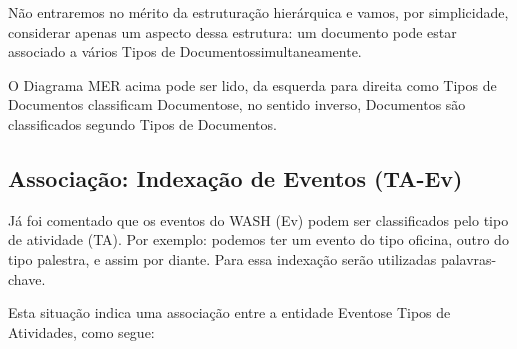 \documentclass[
12pt,		%
openright,	%
twoside,  %
a4paper,			%
chapter=TITLE,		%
english,			%
french,				%
spanish,			%
brazil				%
]{USPSC-classe/USPSC}
\begin{document}
N\~ao entraremos no m\'erito da estrutura\c{c}\~ao hier\'arquica e vamos, por simplicidade, considerar apenas um aspecto dessa estrutura: um documento pode estar associado a v\'arios \textquotedbl Tipos de Documentos\textquotedbl  simultaneamente.






O Diagrama MER acima pode ser lido, da esquerda para direita como \textquotedbl Tipos de Documentos classificam Documentos\textquotedbl  e, no sentido inverso, \textquotedbl Documentos s\~ao classificados segundo Tipos de Documentos\textquotedbl .




\subsection[Associa\c{c}\~ao: Indexa\c{c}\~ao de Eventos (TA-Ev)]{Associa\c{c}\~ao: Indexa\c{c}\~ao de Eventos (TA-Ev)}\label{Associa\c{c}\~ao: Indexa\c{c}\~ao de Eventos (TA-Ev)}
J\'a foi comentado que os eventos do WASH (Ev) podem ser classificados pelo tipo de atividade (TA). Por exemplo: podemos ter um evento do tipo oficina, outro do tipo palestra, e assim por diante. Para essa indexa\c{c}\~ao ser\~ao utilizadas palavras-chave.




Esta situa\c{c}\~ao indica uma associa\c{c}\~ao entre a entidade \textquotedbl Eventos\textquotedbl  e \textquotedbl Tipos de Atividades\textquotedbl , como segue:





\end{document}
